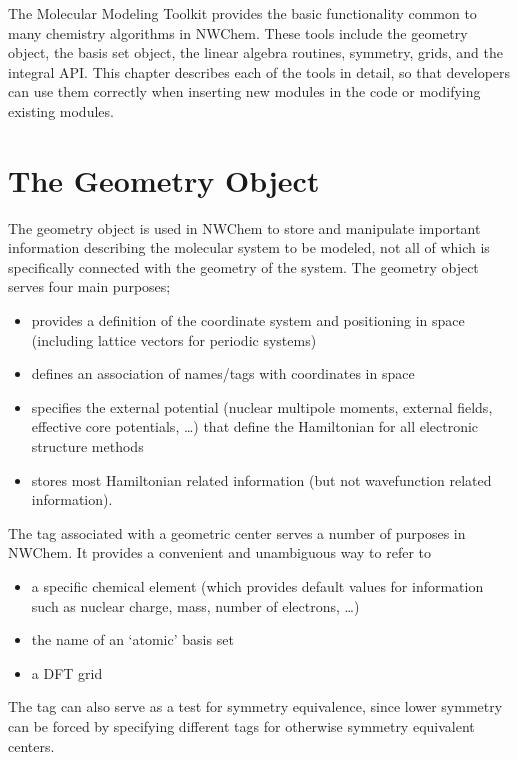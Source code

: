 \label{sec:mmt}

The Molecular Modeling Toolkit provides the basic functionality common to many
chemistry algorithms in NWChem.  These tools include the geometry object,
the basis set object, the linear algebra routines, symmetry, grids, and
the integral API.  This chapter describes each of the tools
in detail, so that developers can use them correctly when inserting new modules in
the code or modifying existing modules.  

\section{The Geometry Object}

\label{sec:geometry}

The geometry object is used in NWChem to store and manipulate important
information describing the molecular system to be modeled, not all of
which is specifically connected with the geometry of the system.  The
geometry object serves four main purposes; 
\begin{itemize}
\item provides a definition of the coordinate system and positioning in space
  (including lattice vectors for periodic systems)
\item defines an association of names/tags with coordinates in space
\item specifies the external potential (nuclear multipole
  moments, external fields, effective core potentials, \ldots) that
  define the Hamiltonian for all electronic structure methods
\item stores most Hamiltonian related information (but
  not wavefunction related information).
\end{itemize}

The tag associated with a geometric center serves a number of purposes in NWChem.
It provides a convenient and unambiguous way to refer to
\begin{itemize}
\item a specific chemical element (which provides default values for information
such as nuclear charge,
  mass, number of electrons, \ldots)
\item the name of an `atomic' basis set
\item a DFT grid
\end{itemize}

The tag can also serve as a test for symmetry equivalence, since lower symmetry 
can be forced
by specifying different tags for otherwise symmetry equivalent
centers.

